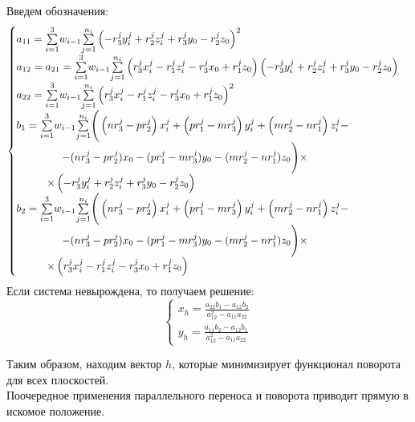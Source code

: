 \newpage
Введем обозначения:
$$\begin{cases}
	a_{11} = \underset{i=1}{\overset{3}{\sum}}w_{i-1}\underset{j=1}{\overset{n_i}{\sum}} 
		\left( -r_3^j y_i^j + r_2^j z_i^j + r_3^j y_0 -r_2^j z_0 \right)^2 \\
	a_{12} = a_{21} = \underset{i=1}{\overset{3}{\sum}}w_{i-1}\underset{j=1}{\overset{n_i}{\sum}}
		\left( r_3^j x_i^j - r_1^j z_i^j - r_3^j x_0 + r_1^j z_0 \right) \left( - r_3^j y_i^j + r_2^j z_i^j + r_3^j y_0 - r_2^j z_0 \right) \\
	a_{22} = \underset{i=1}{\overset{3}{\sum}}w_{i-1}\underset{j=1}{\overset{n_i}{\sum}}
		\left( r_3^j x_i^j - r_1^j z_i^j - r_3^j x_0 + r_1^j z_0 \right)^2\\
	b_1 = \underset{i=1}{\overset{3}{\sum}}w_{i-1}\underset{j=1}{\overset{n_i}{\sum}}
		\Bigg( \left( n r_3^j - p r_2^j \right)x_i^j + \left( p r_1^j - m r_3^j \right)y_i^j + \left( m r_2^j - n r_1^j \right) z_i^j -  \\
		\hspace{1.5cm} - (n r_3^j - p r_2^j) x_0 - (p r_1^j - m r_3^j) y_0 - (m r_2^j - n r_1^j) z_0 \Bigg) \times \\
		\hspace{1cm} \times \left( - r_3^j y_i^j + r_2^j z_i^j + r_3^j y_0 - r_2^j z_0 \right) \\
	b_2 = \underset{i=1}{\overset{3}{\sum}}w_{i-1}\underset{j=1}{\overset{n_i}{\sum}}
		\Bigg( \left( n r_3^j - p r_2^j \right)x_i^j + \left( p r_1^j - m r_3^j \right)y_i^j + \left( m r_2^j - n r_1^j \right) z_i^j -  \\
		\hspace{1.5cm} - (n r_3^j - p r_2^j) x_0 - (p r_1^j - m r_3^j) y_0 - (m r_2^j - n r_1^j) z_0 \Bigg) \times \\
		\hspace{1cm} \times \left( r_3^j x_i^j - r_1^j z_i^j - r_3^j x_0 + r_1^j z_0 \right)
\end{cases}$$
Если система невырождена, то получаем решение:
$$\begin{cases}
	x_h = \frac{a_{22} b_1 - a_{12} b_2}{a_{12}^2 - a_{11}a_{22}} \\
	y_h = \frac{a_{11} b_2 - a_{12} b_1}{a_{12}^2 - a_{11}a_{22}}
\end{cases}$$

Таким образом, находим вектор $h$, которые минимизирует функционал поворота для всех плоскостей.\\

Поочередное применения параллельного переноса и поворота приводит прямую в искомое положение. 

